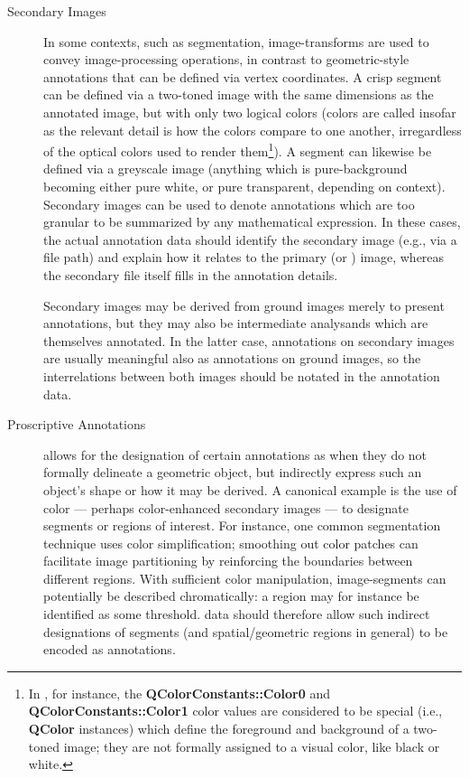 {\begin{description}
\item[Secondary Images]  In some contexts, such 
as segmentation, image-transforms are used to 
convey image-processing operations, in contrast 
to geometric-style annotations that can be 
defined via vertex coordinates.  A crisp 
segment can be defined via a two-toned image 
with the same dimensions as the annotated 
image, but with only two logical colors 
(colors are called  insofar as the 
relevant detail is how the colors compare to 
one another, irregardless of the optical colors 
used to render them\footnote{In \sQt{}, for instance, 
the \textbf{QColorConstants::Color0} and 
\textbf{QColorConstants::Color1} color values 
are considered to be special  
(i.e., \textbf{QColor} instances) which define 
the foreground and background of a two-toned 
image; they are not formally assigned to a 
visual color, like black or white.}).  
A  segment can likewise be defined 
via a greyscale image (anything which 
is pure-background becoming either pure white, 
or pure transparent, depending on context).  
Secondary images can be used to denote annotations 
which are too granular to be summarized by 
any mathematical expression.  In these cases, 
the actual annotation data should identify the 
secondary image (e.g., via a file path) and 
explain how it relates to the primary 
(or ) image, whereas the secondary 
file itself fills in the annotation details.      

Secondary images may be derived from ground 
images merely to present annotations, but they 
may also be intermediate analysands which are 
themselves annotated.  In the latter case, 
annotations on secondary images are usually 
meaningful also as annotations on ground 
images, so the interrelations between both 
images should be notated in the annotation data.

\item[Proscriptive Annotations]  \lAXFI{} 
allows for the designation of certain annotations 
as  when they do not 
formally delineate a geometric object, but 
indirectly express such an object's shape 
or how it may be derived.  A canonical 
example is the use of color --- perhaps 
color-enhanced secondary images --- to 
designate segments or regions of interest.  
For instance, one common segmentation technique 
uses color simplification; smoothing out color 
patches can facilitate image partitioning 
by reinforcing the boundaries between different 
regions.  With sufficient color manipulation, 
image-segments can potentially be described 
chromatically: a region may for instance 
be identified as  some 
threshold.  \lAXFI{} data should therefore 
allow such indirect designations of 
segments (and spatial/geometric regions in 
general) to be encoded as annotations.


\end{description}}
